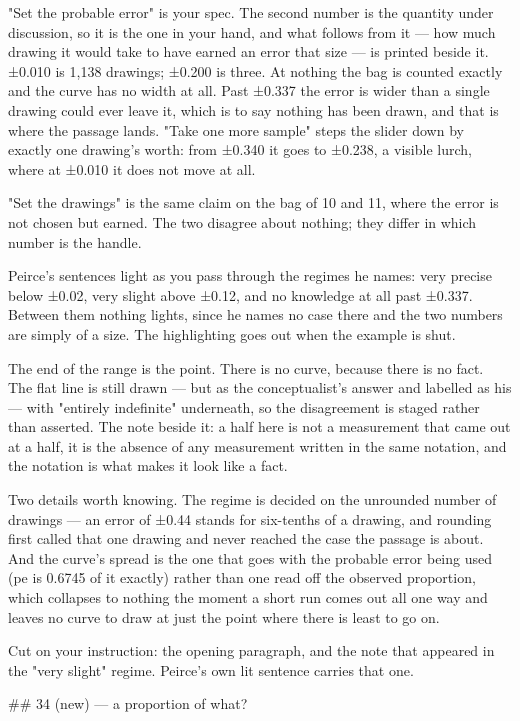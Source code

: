 "Set the probable error" is your spec. The second number is the quantity under
discussion, so it is the one in your hand, and what follows from it — how much
drawing it would take to have earned an error that size — is printed beside it.
±0.010 is 1,138 drawings; ±0.200 is three. At nothing the bag is counted exactly
and the curve has no width at all. Past ±0.337 the error is wider than a single
drawing could ever leave it, which is to say nothing has been drawn, and that is
where the passage lands. "Take one more sample" steps the slider down by exactly
one drawing's worth: from ±0.340 it goes to ±0.238, a visible lurch, where at
±0.010 it does not move at all.

"Set the drawings" is the same claim on the bag of 10 and 11, where the error is
not chosen but earned. The two disagree about nothing; they differ in which
number is the handle.

Peirce's sentences light as you pass through the regimes he names: very precise
below ±0.02, very slight above ±0.12, and no knowledge at all past ±0.337.
Between them nothing lights, since he names no case there and the two numbers
are simply of a size. The highlighting goes out when the example is shut.

The end of the range is the point. There is no curve, because there is no fact.
The flat line is still drawn — but as the conceptualist's answer and labelled as
his — with "entirely indefinite" underneath, so the disagreement is staged
rather than asserted. The note beside it: a half here is not a measurement that
came out at a half, it is the absence of any measurement written in the same
notation, and the notation is what makes it look like a fact.

Two details worth knowing. The regime is decided on the unrounded number of
drawings — an error of ±0.44 stands for six-tenths of a drawing, and rounding
first called that one drawing and never reached the case the passage is about.
And the curve's spread is the one that goes with the probable error being used
(pe is 0.6745 of it exactly) rather than one read off the observed proportion,
which collapses to nothing the moment a short run comes out all one way and
leaves no curve to draw at just the point where there is least to go on.

Cut on your instruction: the opening paragraph, and the note that appeared in
the "very slight" regime. Peirce's own lit sentence carries that one.


## 34 (new) — a proportion of what?

